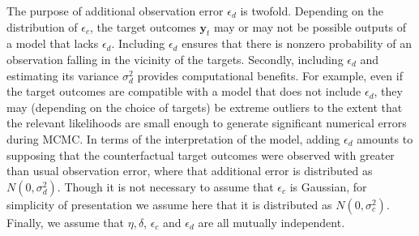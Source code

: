 \documentclass[12pt]{article}
\begin{document}
%
The purpose of additional observation error $\epsilon_d$ is twofold.
%
Depending on the distribution of $\epsilon_c$, the target outcomes $\mathbf y_t$ may or may not be possible outputs of a model that lacks $\epsilon_d$.
%
Including $\epsilon_d$ ensures that there is nonzero probability of an observation falling in the vicinity of the targets.
%
Secondly, including $\epsilon_d$ and estimating its variance $\sigma_d^2$ provides computational benefits.
%
For example, even if the target outcomes are compatible with a model that does not include $\epsilon_d$, they may (depending on the choice of targets) be extreme outliers to the extent that the relevant likelihoods are small enough to generate significant numerical errors during MCMC.
%
In terms of the interpretation of the model, adding $\epsilon_d$ amounts to supposing that the counterfactual target outcomes were observed with greater than usual observation error, where that additional error is distributed as $N(0,\sigma_d^2)$.
%
Though it is not necessary to assume that $\epsilon_c$ is Gaussian, for simplicity of presentation we assume here that it is distributed as $N(0,\sigma^2_c)$.
%
Finally, we assume that $\eta,\delta$, $\epsilon_c$ and $\epsilon_d$ are all mutually independent.
%
\end{document}
